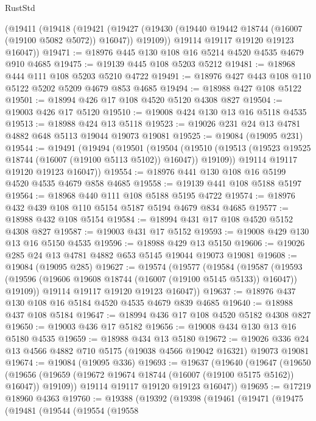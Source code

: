 \begin{lexlean}{RustStd}
\begin{coremodule}
    (@19411
      (@19418
        (@19421
          (@19427 (@19430 (@19440 @19442 @18744 (@16007 (@19100 @5082 @5072)) @16047)) @19109))
        @19114
        @19117
        @19120
        @19123
        @16047))
@19471 := @18976 @445 @130 @108 @16 @5214 @4520 @4535 @4679 @910 @4685
@19475 := @19139 @445 @108 @5203 @5212
@19481 := @18968 @444 @111 @108 @5203 @5210 @4722
@19491 := @18976 @427 @443 @108 @110 @5122 @5202 @5209 @4679 @853 @4685
@19494 := @18988 @427 @108 @5122
@19501 := @18994 @426 @17 @108 @4520 @5120 @4308 @827
@19504 := @19003 @426 @17 @5120
@19510 := @19008 @424 @130 @13 @16 @5118 @4535
@19513 := @18988 @424 @13 @5118
@19523 := @19026 @231 @24 @13 @4781 @4882 @648 @5113 @19044 @19073 @19081
@19525 := @19084 (@19095 @231)
@19544 := @19491
    (@19494
      (@19501
        (@19504
          (@19510 (@19513 (@19523 @19525 @18744 (@16007 (@19100 @5113 @5102)) @16047)) @19109))
        @19114
        @19117
        @19120
        @19123
        @16047))
@19554 := @18976 @441 @130 @108 @16 @5199 @4520 @4535 @4679 @858 @4685
@19558 := @19139 @441 @108 @5188 @5197
@19564 := @18968 @440 @111 @108 @5188 @5195 @4722
@19574 := @18976 @432 @439 @108 @110 @5154 @5187 @5194 @4679 @834 @4685
@19577 := @18988 @432 @108 @5154
@19584 := @18994 @431 @17 @108 @4520 @5152 @4308 @827
@19587 := @19003 @431 @17 @5152
@19593 := @19008 @429 @130 @13 @16 @5150 @4535
@19596 := @18988 @429 @13 @5150
@19606 := @19026 @285 @24 @13 @4781 @4882 @653 @5145 @19044 @19073 @19081
@19608 := @19084 (@19095 @285)
@19627 := @19574
    (@19577
      (@19584
        (@19587
          (@19593 (@19596 (@19606 @19608 @18744 (@16007 (@19100 @5145 @5133)) @16047)) @19109))
        @19114
        @19117
        @19120
        @19123
        @16047))
@19637 := @18976 @437 @130 @108 @16 @5184 @4520 @4535 @4679 @839 @4685
@19640 := @18988 @437 @108 @5184
@19647 := @18994 @436 @17 @108 @4520 @5182 @4308 @827
@19650 := @19003 @436 @17 @5182
@19656 := @19008 @434 @130 @13 @16 @5180 @4535
@19659 := @18988 @434 @13 @5180
@19672 := @19026 @336 @24 @13 @4566 @4882 @710 @5175 (@19038 @4566 @19042 @16321) @19073 @19081
@19674 := @19084 (@19095 @336)
@19693 := @19637
    (@19640
      (@19647
        (@19650
          (@19656 (@19659 (@19672 @19674 @18744 (@16007 (@19100 @5175 @5162)) @16047)) @19109))
        @19114
        @19117
        @19120
        @19123
        @16047))
@19695 := @17219 @18960 @4363
@19760 := @19388
    (@19392
      (@19398
        (@19461
          (@19471
            (@19475
              (@19481
                (@19544
                  (@19554
                    (@19558

\end{coremodule}
\end{lexlean}
